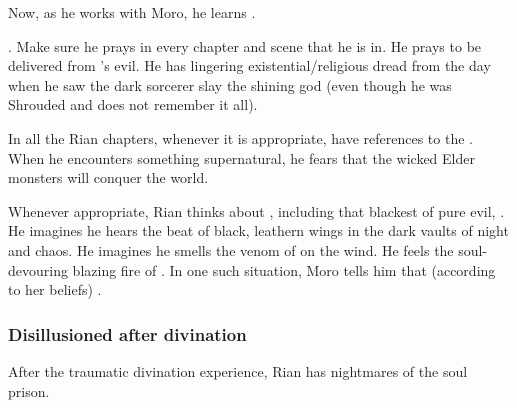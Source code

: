 
Now, as he works with Moro, he learns . 
    
.
Make sure he prays in every chapter and scene that he is in.
He prays to be delivered from \Isphet's evil. 
He has lingering existential/religious dread from the day when he saw the dark sorcerer slay the shining god (even though he was Shrouded and does not remember it all). 

In all the Rian chapters, whenever it is appropriate, have references to the . 
When he encounters something supernatural, he fears that the wicked Elder monsters will conquer the world. 

Whenever appropriate, Rian thinks about \dragons, including that blackest \dragon of pure evil, \Isphet.
He imagines he hears the beat of black, leathern wings in the dark vaults of night and chaos. 
He imagines he smells the venom of \dragons on the wind. 
He feels the soul-devouring blazing fire of \dragons. 
In one such situation, Moro tells him that (according to her beliefs) . 





\subsubsection{Disillusioned after divination}
After the traumatic divination experience, Rian has nightmares of the \Sephirah{} soul prison.

